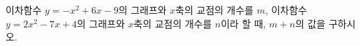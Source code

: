 이차함수 $y=-x^2+6x-9$의 그래프와 $x$축의 교점의 개수를 $m$, 이차함수 $y=2x^2-7x+4$의 그래프와 $x$축의 교점의 개수를 $n$이라 할 때, $m+n$의 값을 구하시오.
